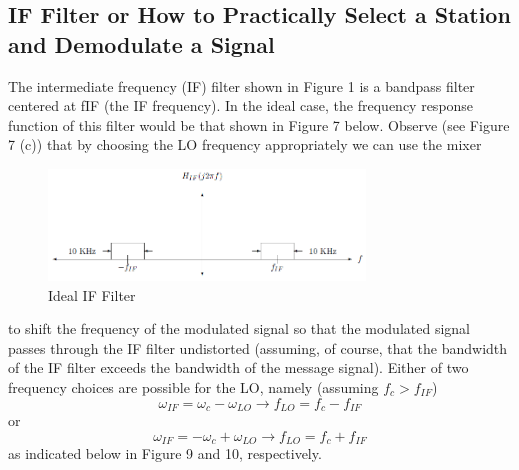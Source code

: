 \documentclass[utf8]{article}
\begin{document}
\subsection{IF Filter or How to Practically Select a Station and Demodulate a Signal}
{
	The intermediate frequency (IF) filter shown in Figure 1 is a bandpass filter centered at fIF (the IF frequency). In the ideal case, the frequency response function of this filter would be that shown in Figure 7 below. Observe (see Figure 7 (c)) that by choosing the LO frequency appropriately we can use the mixer

	\begin{figure}[H]
		\begin{small}
			\begin{center}
				\includegraphics[width=0.75\textwidth]{figures/Figure8.png}
			\end{center}
			\caption{Ideal IF Filter}
			\label{fig:idealif}
		\end{small}
	\end{figure}

	to shift the frequency of the modulated signal so that the modulated signal passes through the IF filter undistorted (assuming, of course, that the bandwidth of the IF filter exceeds the bandwidth of the message signal). Either of two frequency choices are possible for the LO, namely (assuming $f_c > f_{IF}$)
	$$\omega_{IF} = \omega_c-\omega_{LO}\rightarrow f_{LO} = f_c-f_{IF}$$
	or
	$$\omega_{IF} = -\omega_c+\omega_{LO}\rightarrow f_{LO} = f_c+f_{IF}$$
	as indicated below in Figure 9 and 10, respectively.

}
\end{document}
